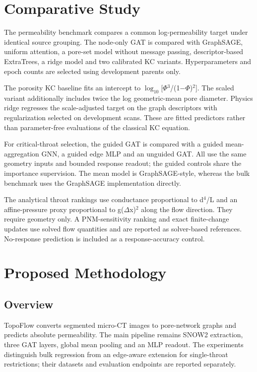 \documentclass[a4paper]{svproc}
\begin{document}
\section{Comparative Study}

The permeability benchmark compares a common log-permeability target under identical source grouping. The node-only GAT is compared with GraphSAGE, uniform attention, a pore-set model without message passing, descriptor-based ExtraTrees, a ridge model and two calibrated KC variants. Hyperparameters and epoch counts are selected using development parents only.

The porosity KC baseline fits an intercept to \ensuremath{\log_{10}}[\ensuremath{\Phi}\ensuremath{^{3}}/(1\ensuremath{-}\ensuremath{\Phi})\ensuremath{^{2}}]. The scaled variant additionally includes twice the log geometric-mean pore diameter. Physics ridge regresses the scale-adjusted target on the graph descriptors with regularization selected on development scans. These are fitted predictors rather than parameter-free evaluations of the classical KC equation.

For critical-throat selection, the guided GAT is compared with a guided mean-aggregation GNN, a guided edge MLP and an unguided GAT. All use the same geometry inputs and bounded response readout; the guided controls share the importance supervision. The mean model is GraphSAGE-style, whereas the bulk benchmark uses the GraphSAGE implementation directly.

The analytical throat rankings use conductance proportional to d\ensuremath{^{4}}/L and an affine-pressure proxy proportional to g(\ensuremath{\Delta}x)\ensuremath{^{2}} along the flow direction. They require geometry only. A PNM-sensitivity ranking and exact finite-change updates use solved flow quantities and are reported as solver-based references. No-response prediction is included as a response-accuracy control.

\section{Proposed Methodology}

\subsection{Overview}

TopoFlow converts segmented micro-CT images to pore-network graphs and predicts absolute permeability. The main pipeline remains SNOW2 extraction, three GAT layers, global mean pooling and an MLP readout. The experiments distinguish bulk regression from an edge-aware extension for single-throat restrictions; their datasets and evaluation endpoints are reported separately.
\end{document}
